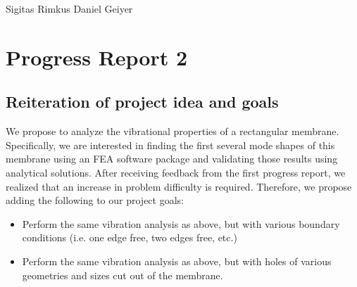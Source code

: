 \documentclass[10pt]{article}
\begin{document}
\hfill Sigitas Rimkus \qquad Daniel Geiyer
\section*{Progress Report 2}
\subsection*{Reiteration of project idea and goals}
We propose to analyze the vibrational properties of a rectangular membrane.  Specifically, we are interested in finding the first several mode shapes of this membrane using an FEA software package and validating those results using analytical solutions.  After receiving feedback from the first progress report, we realized that an increase in problem difficulty is required.  Therefore, we propose adding the following to our project goals:
\begin{itemize}
	\item{Perform the same vibration analysis as above, but with various boundary conditions (i.e. one edge free, two edges free, etc.)}
	\item{Perform the same vibration analysis as above, but with holes of various geometries and sizes cut out of the membrane.}
\end{itemize}
\end{document}
